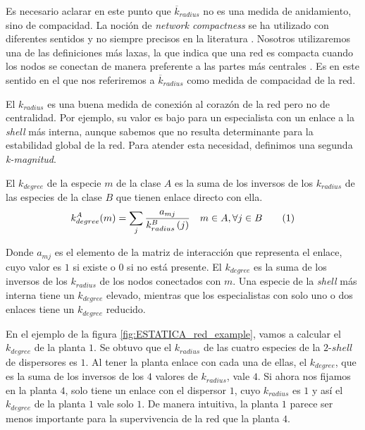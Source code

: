 Es necesario aclarar en este punto que $\overline {k}_{radius}$ no es una medida de anidamiento, sino de compacidad. La noción de \textit{network compactness} se ha utilizado con diferentes sentidos y no siempre precisos en la literatura \cite{wagner2003does, egghe2003measure, chapanond2005graph, zhang2011constructing}. Nosotros utilizaremos una de las definiciones más laxas, la que indica que una red es compacta cuando los nodos se conectan de manera preferente a las partes más centrales \cite{alava2004preferential}. Es en este sentido en el que nos referiremos a $\overline {k}_{radius}$ como medida de compacidad de la red.

El ${k}_{radius}$ es una buena medida de conexión al corazón de la red pero no de centralidad. Por ejemplo, su valor es bajo para un especialista con un enlace a la \textit{shell} más interna, aunque sabemos que no resulta determinante para la estabilidad global de la red. Para atender esta necesidad, definimos una segunda \textit{k-magnitud}.

\begin{theo} 
El \textit{$k_{degree}$} de la especie $m$ de la clase $A$ es la suma de los inversos de los $k_{radius}$ de las especies de la clase $B$ que tienen enlace directo con ella.
\begin{align*}
\displaystyle
k^A_{degree}(m) = \sum\limits_{j} \frac{a_{mj} }{k^B_{radius}\left(j\right)}  \quad   m \in A, \forall j \in B
\stepcounter{equation}\tag{\theequation}
\end{align*}
\label{kdegree}
\end{theo}

Donde $a_{mj}$ es el elemento de la matriz de interacción que representa el enlace, cuyo valor es $1$ si existe o $0$ si no está presente. El $k_{degree}$ es la suma de los inversos de los $k_{radius}$ de los nodos conectados con $m$. Una especie de la \textit{shell} más interna tiene un $k_{degree}$ elevado,  mientras que los especialistas con solo uno o dos enlaces tiene un $k_{degree}$ reducido. 

En el ejemplo de la figura \ref{fig:ESTATICA_red_example}, vamos a calcular el $k_{degree}$ de la planta $1$. Se obtuvo que el $k_{radius}$ de las cuatro especies de la $2$-$shell$ de dispersores es $1$. Al tener la planta enlace con cada una de ellas, el $k_{degree}$, que es la suma de los inversos de los $4$ valores de $k_{radius}$, vale $4$. Si ahora nos fijamos en la planta $4$, solo tiene un enlace con el dispersor $1$, cuyo $k_{radius}$ es $1$ y así el $k_{degree}$ de la planta $1$ vale solo $1$. De manera intuitiva, la planta $1$ parece ser menos importante para la supervivencia de la red que la planta $4$. 


